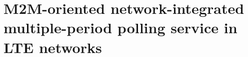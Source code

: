 \chapter{M2M-oriented network-integrated multiple-period polling service in LTE networks}
\label{chapter:vtcfall15}

\ifpdf
    \graphicspath{{Chapter6/Figs/Raster/}{Chapter6/Figs/PDF/}{Chapter3/Figs/}}
\else
    \graphicspath{{Chapte6/Figs/Vector/}{Chapter6/Figs/}}
\fi






















